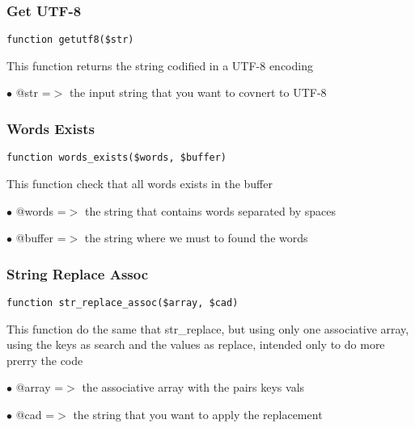 \documentclass[a4paper]{article}
\begin{document}
\hypertarget{toc245}{}
\subsubsection{Get UTF-8}

\begin{lstlisting}
function getutf8($str)
\end{lstlisting}

This function returns the string codified in a UTF-8 encoding

\begin{compactitem}
\item[\color{myblue}$\bullet$] @str =$>$ the input string that you want to covnert to UTF-8
\end{compactitem}

\hypertarget{toc246}{}
\subsubsection{Words Exists}

\begin{lstlisting}
function words_exists($words, $buffer)
\end{lstlisting}

This function check that all words exists in the buffer

\begin{compactitem}
\item[\color{myblue}$\bullet$] @words  =$>$ the string that contains words separated by spaces
\item[\color{myblue}$\bullet$] @buffer =$>$ the string where we must to found the words
\end{compactitem}

\hypertarget{toc247}{}
\subsubsection{String Replace Assoc}

\begin{lstlisting}
function str_replace_assoc($array, $cad)
\end{lstlisting}

This function do the same that str\_replace, but using only one associative
array, using the keys as search and the values as replace, intended only
to do more prerry the code

\begin{compactitem}
\item[\color{myblue}$\bullet$] @array =$>$ the associative array with the pairs keys vals
\item[\color{myblue}$\bullet$] @cad   =$>$ the string that you want to apply the replacement
\end{compactitem}
\end{document}
